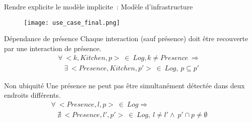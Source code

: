 \begin{frame}{Rendre explicite le modèle implicite~: Modèle d'infrastructure}
  \addtocounter{framenumber}{-1}
  \begin{minipage}{0.3\linewidth}
      \begin{figure}
        \texttt{[image: use\_case\_final.png]}
      \end{figure}
    \end{minipage}
  \hfill
  \begin{minipage}{0.65\linewidth}
    \begin{coloredbox}[black]{Dépendance de présence}
      \footnotesize
      Chaque interaction (sauf présence) doit être recouverte par une interaction de présence.
      \small
      \begin{displaymath}
        \begin{array}{c}
          \forall~<k, Kitchen, p>~\in~Log, k \neq Presence~ \Rightarrow \\
          ~~~~\exists~ <Presence, Kitchen, p'>~\in~Log,~p \subseteq p' 
        \end{array}
      \end{displaymath}
    \end{coloredbox}
    \begin{coloredbox}[black]{Non ubiquité}
      \footnotesize
      Une présence ne peut pas être simultanément détectée dans deux endroits différents.
      \small
      \begin{displaymath}
        \begin{array}{c}
          \forall~<Presence, l, p>~\in~Log \Rightarrow \\
          ~~~~\nexists~ <Presence, l', p'>~\in~Log,~l \neq l' \wedge ~p' \cap p \neq \emptyset
        \end{array}
      \end{displaymath}

    \end{coloredbox}
  \end{minipage}
\end{frame}
